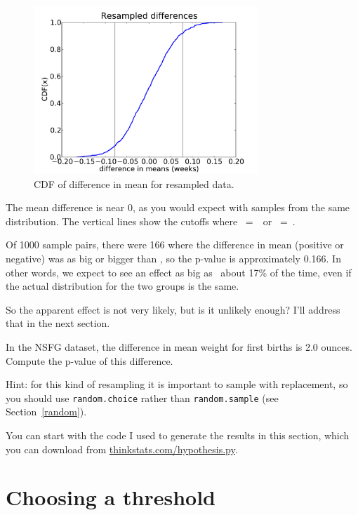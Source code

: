 \documentclass[12pt]{book}
\begin{document}
\begin{figure}
\centerline{\includegraphics[height=2.5in]{figs/length_deltas_cdf.pdf}}
\caption{CDF of difference in mean for resampled data.}
\label{length_deltas_cdf}
\end{figure}

The mean difference is near 0, as you would expect with samples
from the same distribution.  The vertical lines show the cutoffs where
\x~=~\minus\mydelta~or \x~=~\mydelta.

Of 1000 sample pairs, there were 166 where the difference in mean
(positive or negative) was as big or bigger than \mydelta, so the
p-value is approximately 0.166.  In other words, we expect to see an
effect as big as \mydelta~about 17\% of the time, even if the actual
distribution for the two groups is the same.

So the apparent effect is not very likely, but is it unlikely enough?
I'll address that in the next section.

\begin{exercise}
In the NSFG dataset, the difference in mean weight for first
births is 2.0 ounces.  Compute the p-value of this difference.

Hint: for this kind of resampling it is important to sample
with replacement, so you should use {\tt random.choice} rather
than {\tt random.sample} (see Section~\ref{random}).

You can start with the code I used to generate the results in this
section, which you can download from \url{thinkstats.com/hypothesis.py}.

\end{exercise}


\section{Choosing a threshold}
\label{threshold}
\end{document}
